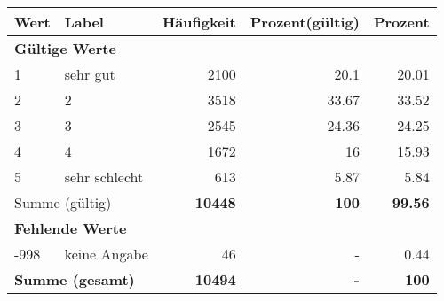      \begin{longtable}{lXrrr}
     \toprule
     \textbf{Wert} & \textbf{Label} & \textbf{Häufigkeit} & \textbf{Prozent(gültig)} & \textbf{Prozent} \\
     \endhead
     \midrule
     \multicolumn{5}{l}{\textbf{Gültige Werte}}\\

     1 &
     \multicolumn{1}{X}{ sehr gut   } &


       \num{2100} &
       \num[round-mode=places,round-precision=2]{20,1} &
         \num[round-mode=places,round-precision=2]{20,01} \\

     2 &
     \multicolumn{1}{X}{ 2   } &


       \num{3518} &
       \num[round-mode=places,round-precision=2]{33,67} &
         \num[round-mode=places,round-precision=2]{33,52} \\

     3 &
     \multicolumn{1}{X}{ 3   } &


       \num{2545} &
       \num[round-mode=places,round-precision=2]{24,36} &
         \num[round-mode=places,round-precision=2]{24,25} \\

     4 &
     \multicolumn{1}{X}{ 4   } &


       \num{1672} &
       \num[round-mode=places,round-precision=2]{16} &
         \num[round-mode=places,round-precision=2]{15,93} \\

     5 &
     \multicolumn{1}{X}{ sehr schlecht   } &


       \num{613} &
       \num[round-mode=places,round-precision=2]{5,87} &
         \num[round-mode=places,round-precision=2]{5,84} \\
     \midrule
     \multicolumn{2}{l}{Summe (gültig)} &
       \textbf{\num{10448}} &
     \textbf{100} &
       \textbf{\num[round-mode=places,round-precision=2]{99,56}} \\
     \multicolumn{5}{l}{\textbf{Fehlende Werte}}\\
       -998 &
       keine Angabe &
         \num{46} &
        - &
         \num[round-mode=places,round-precision=2]{0,44} \\
     \midrule
     \multicolumn{2}{l}{\textbf{Summe (gesamt)}} &
          \textbf{\num{10494}} &
        \textbf{-} &
        \textbf{100} \\
     \bottomrule
     \end{longtable}
     
